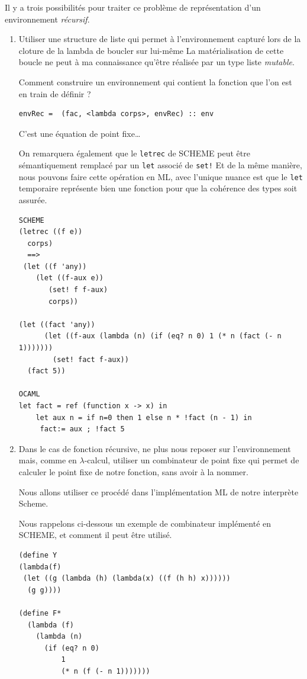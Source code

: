\documentclass[11pt]{book}
\begin{document}
Il y a trois possibilités pour traiter ce problème de représentation d'un environnement \textit{récursif}.
\begin{enumerate}
  \item Utiliser une structure de liste qui permet à l'environnement capturé lors de la cloture de la lambda de boucler sur lui-même
La matérialisation de cette boucle ne peut à ma connaissance qu'être réalisée par un type liste \textit{mutable}.

Comment construire un environnement qui contient la fonction que l'on est en train de définir ?
\begin{Verbatim}
envRec =  (fac, <lambda corps>, envRec) :: env 
\end{Verbatim}
C'est une équation de point fixe\ldots

On remarquera également que le \verb+letrec+ de SCHEME peut être sémantiquement remplacé par un \verb+let+ associé de \verb(set!(
Et de la même manière, nous pouvons faire cette opération en ML, avec l'unique nuance est que le \verb+let+ temporaire représente bien
une fonction pour que la cohérence des types soit assurée.

\begin{Verbatim}
SCHEME
(letrec ((f e))
  corps)
  ==>
 (let ((f 'any))
    (let ((f-aux e))
       (set! f f-aux)
       corps))

(let ((fact 'any))
      (let ((f-aux (lambda (n) (if (eq? n 0) 1 (* n (fact (- n 1)))))))
        (set! fact f-aux))
  (fact 5))

OCAML 
let fact = ref (function x -> x) in
	let aux n = if n=0 then 1 else n * !fact (n - 1) in
	 fact:= aux ; !fact 5
\end{Verbatim}

  \item Dans le cas de fonction récursive, ne plus nous reposer sur l'environnement mais, comme en $\lambda$-calcul, 
  utiliser un combinateur de point fixe qui  permet de calculer le point fixe de notre fonction, sans avoir à la nommer.

  Nous allons utiliser ce procédé dans l'implémentation ML de notre interprète Scheme.

  Nous rappelons ci-dessous un exemple de  combinateur implémenté en SCHEME, et comment il peut être utilisé.
  \begin{Verbatim}
(define Y
(lambda(f)
 (let ((g (lambda (h) (lambda(x) ((f (h h) x))))))
  (g g))))

(define F*
  (lambda (f)
    (lambda (n)
      (if (eq? n 0)
          1
          (* n (f (- n 1)))))))
          

\end{Verbatim}
\end{enumerate}
\end{document}
